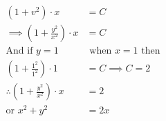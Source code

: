 \documentclass[14pt,fleqn]{extarticle}
\begin{document}
\begin{question}
\begin{step}
\begin{align}
(1+v^2)\cdot x &= C \\
\implies \left( 1 + \frac{y^2}{x^2}\right)\cdot x &= C\\
\text{And if }y = 1& \text{ when }x = 1 \text{ then}  \\
\left( 1 + \frac{1^2}{1^2}\right)\cdot 1 &= C \implies C = 2 \\
\therefore \left( 1 + \frac{y^2}{x^2}\right)\cdot x &= 2 \\[10pt]
\text{or }x^2 + y^2 &= 2x 
\end{align} 
\end{step}
\end{question}
\end{document}
